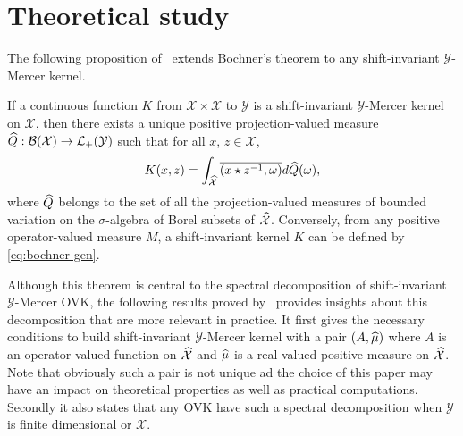 \section{Theoretical study}
The following proposition of~\citet{Zhang2012,Carmeli2010} extends Bochner's
theorem to any shift-invariant $\mathcal{Y}$-Mercer kernel.
\begin{proposition}
    \label{eq:bochner-gen} If a continuous function $K$ from $\mathcal{X}
    \times \mathcal{X}$ to $\mathcal{Y}$ is a shift-invariant
    $\mathcal{Y}$-Mercer kernel on $\mathcal{X}$, then there exists a unique
    positive projection-valued measure $\widehat{Q}: \mathcal{B}(\mathcal{X}) \to
    \mathcal{L}_+(\mathcal{Y})$ such that for all $x$, $z \in \mathcal{X}$,
    \begin{dmath}
        K(x, z) = \int_{\dual{\mathcal{X}}} \conj{\pairing{x \groupop \inv{z},
        \omega}} d\dual{Q}(\omega),
    \end{dmath}
    where $\widehat{Q}$ belongs to the set of all the projection-valued measures
    of bounded variation on the $\sigma$-algebra of Borel subsets of
    $\widehat{\mathcal{X}}$. Conversely, from any positive operator-valued measure
    $M$, a shift-invariant kernel $K$ can be defined by \cref{eq:bochner-gen}.
\end{proposition}
Although this theorem is central to the spectral decomposition of
shift-invariant $\mathcal{Y}$-Mercer \acs{OVK}, the following results proved
by~\citet{Carmeli2010} provides insights about this decomposition that are more
relevant in practice. It first gives the necessary conditions to build
shift-invariant $\mathcal{Y}$-Mercer kernel with a pair $(A, \widehat{\mu})$ where
$A$ is an operator-valued function on $\widehat{\mathcal{X}}$ and $\widehat{\mu}$ is
a real-valued positive measure on $\widehat{\mathcal{X}}$. Note that obviously
such a pair is not unique ad the choice of this paper may have an impact on
theoretical properties as well as practical computations.  Secondly it also
states that any \acs{OVK} have such a spectral decomposition when $\mathcal{Y}$
is finite dimensional or $\mathcal{X}$.

